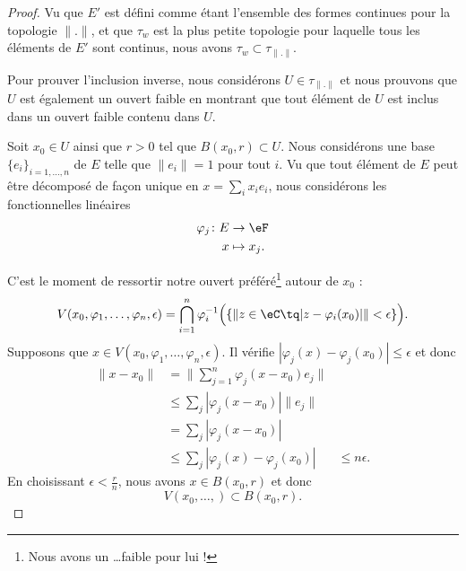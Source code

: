 \begin{proof}
	Vu que \( E'\) est défini comme étant l'ensemble des formes continues pour la topologie \( \| . \|\), et que \( \tau_w\) est la plus petite topologie pour laquelle tous les éléments de \( E'\) sont continus, nous avons \( \tau_w\subset\tau_{\| . \|}\).

	Pour prouver l'inclusion inverse, nous considérons \( U\in\tau_{\| . \|}\) et nous prouvons que \( U\) est également un ouvert faible en montrant que tout élément de $U$ est inclus dans un ouvert faible contenu dans \( U\).


	Soit \( x_0\in U\) ainsi que \( r>0\) tel que \( B(x_0,r)\subset U\). Nous considérons une base \( \{ e_i \}_{i=1,\ldots, n}\) de \( E\) telle que \( \| e_i \|=1\) pour tout \( i\). Vu que tout élément de \( E\) peut être décomposé de façon unique en \( x=\sum_ix_ie_i\), nous considérons les fonctionnelles linéaires
	\begin{equation}
		\begin{aligned}
			\varphi_j\colon E & \to \eF      \\
			x                 & \mapsto x_j.
		\end{aligned}
	\end{equation}

	C'est le moment de ressortir notre ouvert préféré\footnote{Nous avons un \ldots faible pour lui !} autour de \( x_0\) :
	\begin{equation}
		V(x_0,\varphi_1,\ldots, \varphi_n,\epsilon)=\bigcap_{i=1}^n\varphi_i^{-1}\Big( \{  \| z\in \eC\tq | z-\varphi_i(x_0) | \|<\epsilon  \} \Big).
	\end{equation}
	Supposons que \( x\in V(x_0,\varphi_1,\ldots, \varphi_n,\epsilon)\). Il vérifie \( | \varphi_j(x)-\varphi_j(x_0) |\leq \epsilon\) et donc
	\begin{subequations}
		\begin{align}
			\| x-x_0 \| & =\| \sum_{j=1}^n\varphi_j(x-x_0)e_j \|     \\
			            & \leq \sum_j| \varphi_j(x-x_0) |\| e_j \|   \\
			            & = \sum_j| \varphi_j(x-x_0) |               \\
			            & \leq \sum_j| \varphi_j(x)-\varphi_j(x_0) |
			            & \leq n\epsilon.
		\end{align}
	\end{subequations}
	En choisissant \( \epsilon<\frac{ r }{ n }\), nous avons \( x\in B(x_0,r)\) et donc
	\begin{equation}
		V(x_0,\ldots, )\subset B(x_0,r).
	\end{equation}
\end{proof}


